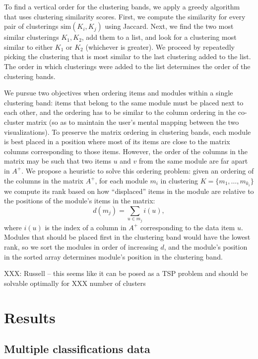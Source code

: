 \documentclass[12pt]{cmuthesis}
\begin{document}

  To find a vertical order for the clustering bands, we apply a greedy algorithm that uses clustering similarity scores. First, we compute the similarity for every pair of clusterings $\textrm{sim}(K_{i}, K_{j})$ using Jaccard. Next, we find the two most similar clusterings $K_{1}, K_{2}$, add them to a list, and look for a clustering most similar to either $K_{1}$ or $K_{2}$ (whichever is greater). We proceed by repeatedly picking the clustering that is most similar to the last clustering added to the list. The order in which clusterings were added to the list determines the order of the clustering bands.


  We pursue two objectives when ordering items and modules within a single clustering band: items that belong to the same module must be placed next to each other, and the ordering has to be similar to the column ordering in the co-cluster matrix (so as to maintain the user's mental mapping between the two visualizations). To preserve the matrix ordering in clustering bands, each module is best placed in a position where most of its items are close to the matrix columns corresponding to those items. However, the order of the columns in the matrix may be such that two items $u$ and $v$ from the same module are far apart in $A^{+}$. We propose a heuristic to solve this ordering problem: given an ordering of the columns in the matrix $A^{+}$, for each module $m_{i}$ in clustering $K = \{m_{1}, \ldots, m_{k_{i}}\}$ we compute its rank based on how ``displaced'' items in the module are relative to the positions of the module's items in the matrix: 
  \[
   d(m_{j}) = \sum_{u \in m_{j}} i(u),
  \]
  where $i(u)$ is the index of a column in $A^{+}$ corresponding to the data item $u$. Modules that should be placed first in the clustering band would have the lowest rank, so we sort the modules in order of increasing $d$, and the module's position in the sorted array determines module's position in the clustering band.

  XXX: Russell -- this seems like it can be posed as a TSP problem and should be solvable optimally for XXX number of clusters

\section{Results}

  \subsection{Multiple classifications data}
  \label{sec:data}
\end{document}

